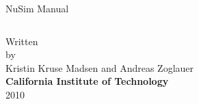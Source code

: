 %
\pagestyle{empty}
\begin{centering}
  \huge{NuSim Manual} \\
\begin{verbatim}

\end{verbatim}


\large{Written}\\ \large{by}\\
\large{Kristin Kruse Madsen and Andreas Zoglauer}\\


\normalsize{\textbf{California Institute of Technology}}\\
2010\\

\end{centering}
%
